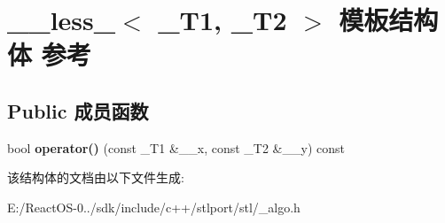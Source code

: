\hypertarget{struct____less__2}{}\section{\+\_\+\+\_\+less\+\_$<$ \+\_\+\+T1, \+\_\+\+T2 $>$ 模板结构体 参考}
\label{struct____less__2}
\subsection*{Public 成员函数}
\begin{DoxyCompactItemize}
\item 
\mbox{\label{struct____less__2_af8f64e9f4fa3d996c2b7445608142252}} 
bool {\bfseries operator()} (const \+\_\+\+T1 \&\+\_\+\+\_\+x, const \+\_\+\+T2 \&\+\_\+\+\_\+y) const
\end{DoxyCompactItemize}


该结构体的文档由以下文件生成\+:\begin{DoxyCompactItemize}
\item 
E\+:/\+React\+O\+S-\/0../sdk/include/c++/stlport/stl/\+\_\+algo.\+h\end{DoxyCompactItemize}

